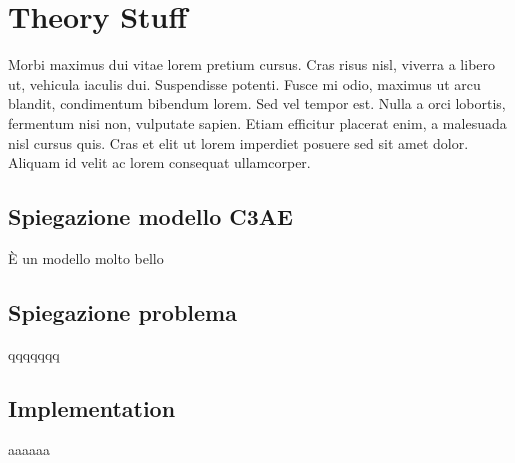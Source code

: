 
\chapter{Theory Stuff}
\label{chp:theorystuff}
Morbi maximus dui vitae lorem pretium cursus. Cras risus nisl, viverra a libero ut, vehicula iaculis dui. Suspendisse potenti. Fusce mi odio, maximus ut arcu blandit, condimentum bibendum lorem. Sed vel tempor est. Nulla a orci lobortis, fermentum nisi non, vulputate sapien. Etiam efficitur placerat enim, a malesuada nisl cursus quis. Cras et elit ut lorem imperdiet posuere sed sit amet dolor. Aliquam id velit ac lorem consequat ullamcorper.
\section{Spiegazione modello C3AE}
È un modello molto bello
\section{Spiegazione problema}
qqqqqqq
\section{Implementation}
aaaaaa
